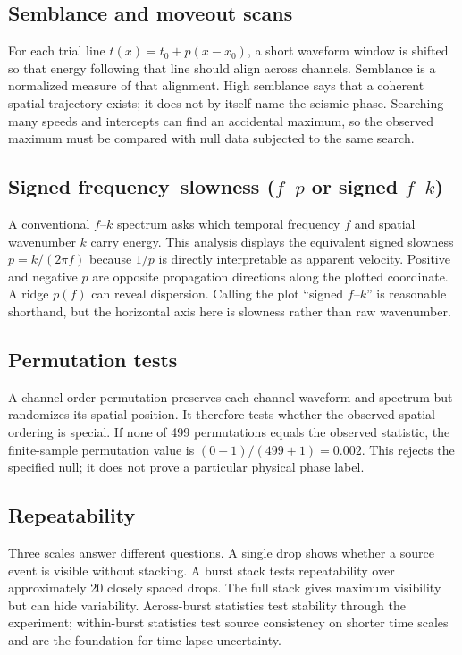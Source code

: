 \documentclass[11pt]{article}
\begin{document}
\subsection{Semblance and moveout scans}

For each trial line $t(x)=t_0+p(x-x_0)$, a short waveform window is shifted so
that energy following that line should align across channels.  Semblance is a
normalized measure of that alignment.  High semblance says that a coherent
spatial trajectory exists; it does not by itself name the seismic phase.
Searching many speeds and intercepts can find an accidental maximum, so the
observed maximum must be compared with null data subjected to the same search.

\subsection{\texorpdfstring{Signed frequency--slowness ($f$--$p$ or signed $f$--$k$)}{Signed frequency--slowness (f--p or signed f--k)}}

A conventional $f$--$k$ spectrum asks which temporal frequency $f$ and spatial
wavenumber $k$ carry energy.  This analysis displays the equivalent signed
slowness $p=k/(2\pi f)$ because $1/p$ is directly interpretable as apparent
velocity.  Positive and negative $p$ are opposite propagation directions along
the plotted coordinate.  A ridge $p(f)$ can reveal dispersion.  Calling the
plot ``signed $f$--$k$'' is reasonable shorthand, but the horizontal axis here
is slowness rather than raw wavenumber.

\subsection{Permutation tests}

A channel-order permutation preserves each channel waveform and spectrum but
randomizes its spatial position.  It therefore tests whether the observed
spatial ordering is special.  If none of 499 permutations equals the observed
statistic, the finite-sample permutation value is
$(0+1)/(499+1)=0.002$.  This rejects the specified null; it does not prove a
particular physical phase label.

\subsection{Repeatability}

Three scales answer different questions.  A single drop shows whether a source
event is visible without stacking.  A burst stack tests repeatability over
approximately 20 closely spaced drops.  The full stack gives maximum visibility
but can hide variability.  Across-burst statistics test stability through the
experiment; within-burst statistics test source consistency on shorter time
scales and are the foundation for time-lapse uncertainty.
\end{document}
